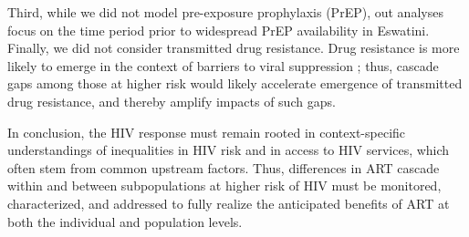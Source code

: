 Third, while we did not model pre-exposure prophylaxis (PrEP), %
out analyses focus on the time period
prior to widespread PrEP availability in Eswatini.
Finally, we did not consider transmitted drug resistance.
Drug resistance is more likely to emerge
in the context of barriers to viral suppression \cite{Pham2014};
thus, cascade gaps among those at higher risk
would likely accelerate emergence of transmitted drug resistance,
and thereby amplify impacts of such gaps.
\par
In conclusion, the HIV response must remain rooted in
context-specific understandings of inequalities in HIV risk and in access to HIV services,
which often stem from common upstream factors.
Thus, differences in ART cascade within and between subpopulations at higher risk of HIV
must be monitored, characterized, and addressed
to fully realize the anticipated benefits of ART
at both the individual and population levels.
\enlargethispage{2ex} %
